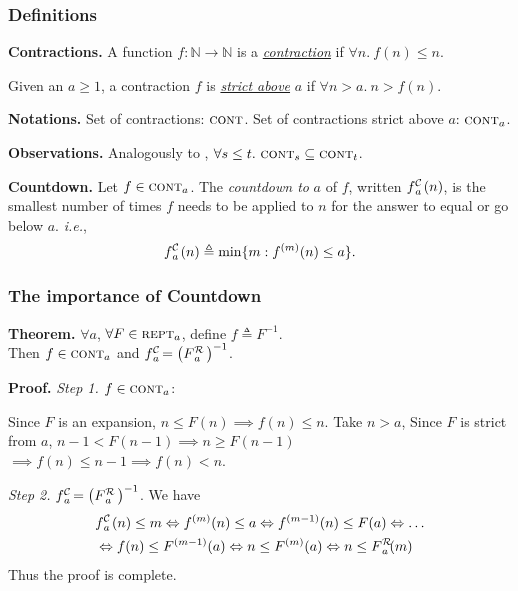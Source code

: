 \begin{frame}
\frametitle{Definitions}
\textbf{Contractions.} A function $f : \mathbb{N} \to \mathbb{N}$ is a
\href{https://github.com/inv-ack/inv-ack/blob/7270e64a2600b771f2b1b1b151f7d13fb2ae6c97/countdown.v\#L40-L42}{\emph{contraction}} if $\forall n.~ f(n) \le n$.

Given an $a \ge 1$, a contraction $f$ is
\href{https://github.com/inv-ack/inv-ack/blob/7270e64a2600b771f2b1b1b151f7d13fb2ae6c97/countdown.v\#L44-L46}{\emph{strict above}} $a$ if $\forall n > a.~n > f(n)$.

\bigskip

\textbf{Notations.} Set of contractions: $\text{\scshape{cont}}$. Set of contractions strict above $a$: $\text{\scshape{cont}}_a$.

\bigskip

\textbf{Observations.} Analogously to
, $\forall s\le t.~ \text{\scshape{cont}}_s \subseteq \text{\scshape{cont}}_t$.

\bigskip

\textbf{Countdown.} Let $f\in \text{\scshape{cont}}_a$. The \textit{countdown to} $a$ of $f$, written
$\cdt{f}{a}(n)$, is the smallest number of times $f$ needs to be applied to
$n$ for the answer to equal or go below $a$. \emph{i.e.},
\begin{equation*}
\cdt{f}{a}(n) \triangleq \min\{m: f^{(m)}(n)\le a \}.
\end{equation*}
\end{frame}


\begin{frame}
\frametitle{The importance of Countdown}
\textbf{Theorem.} $\forall a$, $\forall F\in \text{\scshape{rept}}_a$, define $f\triangleq F^{-1}$. 
\\ Then $f\in \text{\scshape{cont}}_a$ and $\cdt{f}{a}~ = \left(\rf{F}{a}\ \right)^{-1}$.

\bigskip

\textbf{Proof.}
\emph{Step 1.} $f\in \text{\scshape{cont}}_a$:

Since $F$ is an expansion, $n \le F(n)\implies f(n)\le n$.
Take $n> a$, Since $F$ is strict from $a$, $n-1 < F(n-1) \implies n\ge F(n-1)$ $\implies f(n)\le n - 1 \implies f(n) < n$.

\bigskip

\emph{Step 2.} $\cdt{f}{a}~ = \left(\rf{F}{a}\ \right)^{-1}$. We have
\begin{equation*} \label{eq: rf-upp-inv}
\begin{aligned}
& \cdt{f}{a}(n)\le m \iff f^{(m)}(n)\le a \iff f^{(m-1)}(n)\le F(a) \iff \ldots \\
&  \iff f(n)\le F^{(m-1)}(a) \iff n\le F^{(m)}(a) \iff n\le \rf{F}{a}(m)
\end{aligned}
\vspace{-0.5em}
\end{equation*}
Thus the proof is complete.

\end{frame}


